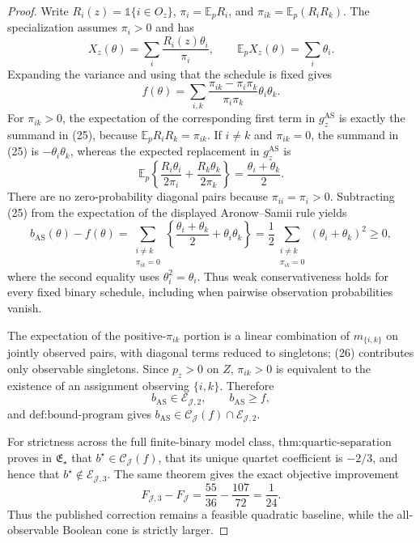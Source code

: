 \documentclass{article}
\begin{document}
\begin{proof}
Write \(R_i(z)=\mathbb 1\{i\in O_z\}\), \(\pi_i=\mathbb E_pR_i\), and \(\pi_{ik}=\mathbb E_p(R_iR_k)\).  The specialization assumes \(\pi_i>0\) and has
\[
 X_z(\theta)=\sum_i\frac{R_i(z)\theta_i}{\pi_i},
 \quad\quad \mathbb E_pX_z(\theta)=\sum_i\theta_i.
\]
Expanding the variance and using that the schedule is fixed gives
\[
 f(\theta)=\sum_{i,k}
 \frac{\pi_{ik}-\pi_i\pi_k}{\pi_i\pi_k}\theta_i\theta_k. \tag{25}
\]
For \(\pi_{ik}>0\), the expectation of the corresponding first term in \(g_z^{\mathrm{AS}}\) is exactly the summand in (25), because \(\mathbb E_pR_iR_k=\pi_{ik}\).  If \(i\ne k\) and \(\pi_{ik}=0\), the summand in (25) is \(-\theta_i\theta_k\), whereas the expected replacement in \(g_z^{\mathrm{AS}}\) is
\[
 \mathbb E_p\left\{
 \frac{R_i\theta_i}{2\pi_i}+\frac{R_k\theta_k}{2\pi_k}
 \right\}=\frac{\theta_i+\theta_k}{2}. \tag{26}
\]
There are no zero-probability diagonal pairs because \(\pi_{ii}=\pi_i>0\).  Subtracting (25) from the expectation of the displayed Aronow--Samii rule yields
\[
 b_{\mathrm{AS}}(\theta)-f(\theta)
 =\sum_{\substack{i\ne k\\\pi_{ik}=0}}
 \left\{\frac{\theta_i+\theta_k}{2}+\theta_i\theta_k\right\}
 =\frac12\sum_{\substack{i\ne k\\\pi_{ik}=0}}
       (\theta_i+\theta_k)^2\ge0, \tag{27}
\]
where the second equality uses \(\theta_i^2=\theta_i\).  Thus weak conservativeness holds for every fixed binary schedule, including when pairwise observation probabilities vanish.

The expectation of the positive-\(\pi_{ik}\) portion is a linear combination of \(m_{\{i,k\}}\) on jointly observed pairs, with diagonal terms reduced to singletons; (26) contributes only observable singletons.  Since \(p_z>0\) on \(Z\), \(\pi_{ik}>0\) is equivalent to the existence of an assignment observing \(\{i,k\}\).  Therefore
\[
 b_{\mathrm{AS}}\in\mathcal E_{\mathcal J,2},
 \quad\quad b_{\mathrm{AS}}\ge f,
\]
and \(\text{def:bound-program}\) gives
\(b_{\mathrm{AS}}\in\mathcal C_{\mathcal J}(f)\cap\mathcal E_{\mathcal J,2}\).

For strictness across the full finite-binary model class, \(\text{thm:quartic-separation}\) proves in \(\mathfrak E_\star\) that \(b^\star\in\mathcal C_{\mathcal J}(f)\), that its unique quartet coefficient is \(-2/3\), and hence that \(b^\star\notin\mathcal E_{\mathcal J,3}\).  The same theorem gives the exact objective improvement
\[
 F_{\mathcal J,3}-F_{\mathcal J}=\frac{55}{36}-\frac{107}{72}=\frac1{24}.
\]
Thus the published correction remains a feasible quadratic baseline, while the all-observable Boolean cone is strictly larger.
\end{proof}
\end{document}
